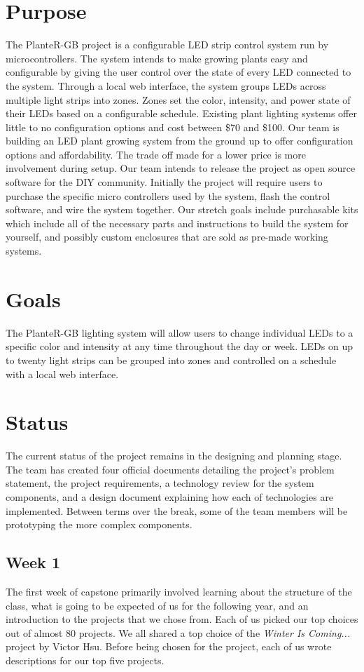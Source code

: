 \documentclass[onecolumn, draftclsnofoot,10pt, compsoc]{IEEEtran}
\begin{document}
	\section{Purpose}
	The PlanteR-GB project is a configurable LED strip control system run by microcontrollers.
	The system intends to make growing plants easy and configurable by giving the user control over the state of every LED connected to the system.
	Through a local web interface, the system groups LEDs across multiple light strips into zones.
	Zones set the color, intensity, and power state of their LEDs based on a configurable schedule.
	Existing plant lighting systems offer little to no configuration options and cost between \$70 and \$100. \cite{expensive1} \cite{expensive2} \cite{expensive3}
	Our team is building an LED plant growing system from the ground up to offer configuration options and affordability.
	The trade off made for a lower price is more involvement during setup. Our team intends to release the project as open source software for the DIY community.
	Initially the project will require users to purchase the specific micro controllers used by the system, flash the control software, and wire the system together.
	Our stretch goals include purchasable kits which include all of the necessary parts and instructions to build the system for yourself, and possibly custom enclosures that are sold as pre-made working systems.

	\section{Goals}
	The PlanteR-GB lighting system will allow users to change individual LEDs to a specific color and intensity at any time throughout the day or week.
	LEDs on up to twenty light strips can be grouped into zones and controlled on a schedule with a local web interface.

	\section{Status}
	The current status of the project remains in the designing and planning stage.  The team has created four official documents detailing the project's problem statement, the project requirements,
	a technology review for the system components, and a design document explaining how each of technologies are implemented. Between terms over the break, some of the team members will be prototyping
	the more complex components.

		\subsection{Week 1}
		The first week of capstone primarily involved learning about the structure of the class, what is going to be expected of us for the following year, and an introduction to the projects that we chose from.
		Each of us picked our top choices out of almost 80 projects. We all shared a top choice of the \textit{Winter Is Coming...} project by Victor Hsu.
		Before being chosen for the project, each of us wrote descriptions for our top five projects.
\end{document}
